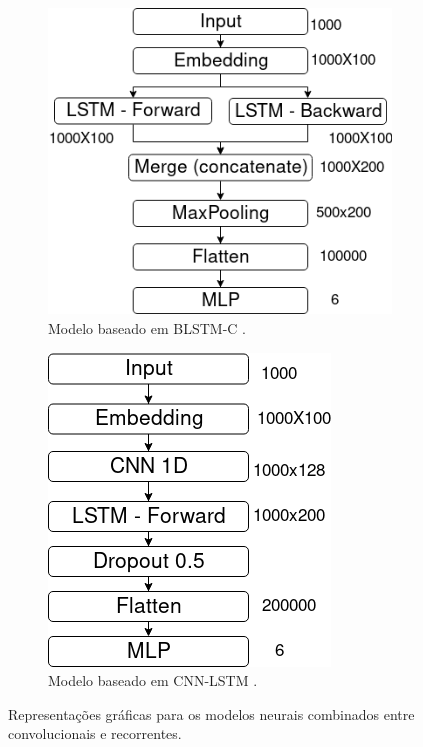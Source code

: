 \begin{figure}[ht]
    \centering
    \begin{subfigure}[b]{0.4\textwidth}
        \includegraphics[width=\textwidth]{figuras/modelos-BLSTM-C}
        \caption{Modelo baseado em BLSTM-C \cite{lai_recurrent_2015}.}
        \label{fig:blstmc}
    \end{subfigure}\hfill
    \begin{subfigure}[b]{0.3\textwidth}
        \includegraphics[width=\textwidth]{figuras/modelos-C-LSTM}
        \caption{Modelo baseado em CNN-LSTM \cite{zhou_c-lstm_2015}.}
        \label{fig:clstm}
    \end{subfigure}
    \caption[Modelos mistos]{Representações gráficas para os modelos neurais combinados entre convolucionais e recorrentes.}
\end{figure}

